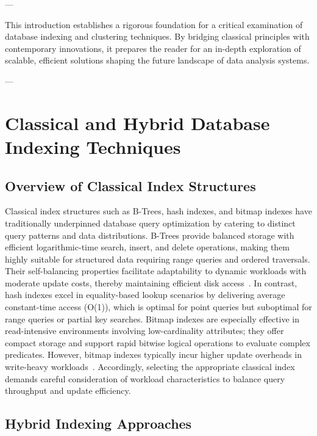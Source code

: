 \documentclass[11pt]{article}
\begin{document}
---

This introduction establishes a rigorous foundation for a critical examination of database indexing and clustering techniques. By bridging classical principles with contemporary innovations, it prepares the reader for an in-depth exploration of scalable, efficient solutions shaping the future landscape of data analysis systems.

---

\section{Classical and Hybrid Database Indexing Techniques}

\subsection{Overview of Classical Index Structures}

Classical index structures such as B-Trees, hash indexes, and bitmap indexes have traditionally underpinned database query optimization by catering to distinct query patterns and data distributions. B-Trees provide balanced storage with efficient logarithmic-time search, insert, and delete operations, making them highly suitable for structured data requiring range queries and ordered traversals. Their self-balancing properties facilitate adaptability to dynamic workloads with moderate update costs, thereby maintaining efficient disk access~\cite{ref31}. In contrast, hash indexes excel in equality-based lookup scenarios by delivering average constant-time access (O(1)), which is optimal for point queries but suboptimal for range queries or partial key searches. Bitmap indexes are especially effective in read-intensive environments involving low-cardinality attributes; they offer compact storage and support rapid bitwise logical operations to evaluate complex predicates. However, bitmap indexes typically incur higher update overheads in write-heavy workloads~\cite{ref31}. Accordingly, selecting the appropriate classical index demands careful consideration of workload characteristics to balance query throughput and update efficiency.

\subsection{Hybrid Indexing Approaches}
\end{document}
